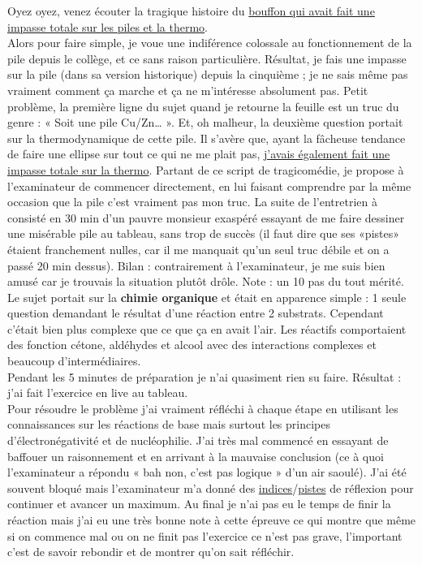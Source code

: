 \lettrine{{\color{yellow!80!black} \oldpilcrowfive}}{}
Oyez oyez, venez écouter la tragique histoire du \href{https://www.youtube.com/watch?v=xc9fCzoszDs}{bouffon qui avait fait une impasse totale sur les piles et la thermo}.\\
Alors pour faire simple, je voue une indiférence colossale au fonctionnement de la pile depuis le collège, et ce sans raison particulière. Résultat, je fais une impasse sur la pile (dans sa version historique) depuis la cinquième ; je ne sais même pas vraiment comment ça marche et ça ne m’intéresse absolument pas. Petit problème, la première ligne du sujet quand je retourne la feuille est un truc du genre : « Soit une pile Cu/Zn… ». Et, oh malheur, la deuxième question portait sur la thermodynamique de cette pile. Il s’avère que, ayant la fâcheuse tendance de faire une ellipse sur tout ce qui ne me plait pas, \href{https://www.youtube.com/watch?v=kOR5Wb9pS90}{j’avais également fait une impasse totale sur la thermo}. Partant de ce script de tragicomédie, je propose à l’examinateur de commencer directement, en lui faisant comprendre par la même occasion que la pile c’est vraiment pas mon truc. La suite de l’entretrien à consisté en 30 min d’un pauvre monsieur exaspéré essayant de me faire dessiner une misérable pile au tableau, sans trop de succès (il faut dire que ses «pistes» étaient franchement nulles, car il me manquait qu’un seul truc débile et on a passé 20 min dessus). Bilan : contrairement à l’examinateur, je me suis bien amusé car je trouvais la situation plutôt drôle. Note : un 10 pas du tout mérité.\\

\lettrine{{\color{violet} \oldpilcrowfive}}{}
Le sujet portait sur la \textbf{chimie organique} et était en apparence simple : 1 seule question demandant le résultat d’une réaction entre 2 substrats. Cependant c’était bien plus complexe que ce que ça en avait l’air. Les réactifs comportaient des fonction cétone, aldéhydes et alcool avec des interactions complexes et beaucoup d’intermédiaires.\\
Pendant les 5 minutes de préparation je n’ai quasiment rien su faire. Résultat : j’ai fait l’exercice en live au tableau.\\
Pour résoudre le problème j’ai vraiment réfléchi à chaque étape en utilisant les connaissances sur les réactions de base mais surtout les principes d’électronégativité et de nucléophilie. J’ai très mal commencé en essayant de baffouer un raisonnement et en arrivant à la mauvaise conclusion (ce à quoi l’examinateur a répondu « bah non, c’est pas logique » d’un air saoulé). J’ai été souvent bloqué mais l’examinateur m’a donné des \href{https://youtube.com/clip/UgkxTXupEBp7blcE3vxyg0e5PwlTX7qR-d0e}{indices}/\href{https://www.youtube.com/watch?v=GNgv_Ean6WM}{pistes} de réflexion pour continuer et avancer un maximum. Au final je n’ai pas eu le temps de finir la réaction mais j’ai eu une très bonne note à cette épreuve ce qui montre que même si on commence mal ou on ne finit pas l’exercice ce n’est pas grave, l’important c’est de savoir rebondir et de montrer qu’on sait réfléchir.\\

